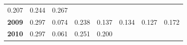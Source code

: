 \documentclass[]{article}
\begin{document}
\begin{longtable}[]{@{}rrrrrrrr@{}}
\begin{minipage}[t]{0.09\columnwidth}
0.207\strut
\end{minipage} & \begin{minipage}[t]{0.08\columnwidth}\raggedleft\strut
0.244\strut
\end{minipage} & \begin{minipage}[t]{0.10\columnwidth}\raggedleft\strut
0.267\strut
\end{minipage}\tabularnewline
\begin{minipage}[t]{0.08\columnwidth}\raggedleft\strut
\textbf{2009}\strut
\end{minipage} & \begin{minipage}[t]{0.10\columnwidth}\raggedleft\strut
0.297\strut
\end{minipage} & \begin{minipage}[t]{0.11\columnwidth}\raggedleft\strut
0.074\strut
\end{minipage} & \begin{minipage}[t]{0.08\columnwidth}\raggedleft\strut
0.238\strut
\end{minipage} & \begin{minipage}[t]{0.14\columnwidth}\raggedleft\strut
0.137\strut
\end{minipage} & \begin{minipage}[t]{0.09\columnwidth}\raggedleft\strut
0.134\strut
\end{minipage} & \begin{minipage}[t]{0.08\columnwidth}\raggedleft\strut
0.127\strut
\end{minipage} & \begin{minipage}[t]{0.10\columnwidth}\raggedleft\strut
0.172\strut
\end{minipage}\tabularnewline
\begin{minipage}[t]{0.08\columnwidth}\raggedleft\strut
\textbf{2010}\strut
\end{minipage} & \begin{minipage}[t]{0.10\columnwidth}\raggedleft\strut
0.297\strut
\end{minipage} & \begin{minipage}[t]{0.11\columnwidth}\raggedleft\strut
0.061\strut
\end{minipage} & \begin{minipage}[t]{0.08\columnwidth}\raggedleft\strut
0.251\strut
\end{minipage} & \begin{minipage}[t]{0.14\columnwidth}\raggedleft\strut
0.200\strut
\end{minipage} & \begin{minipage}[t]{0.09\columnwidth}\raggedleft\strut

\end{minipage}
\end{longtable}
\end{document}

